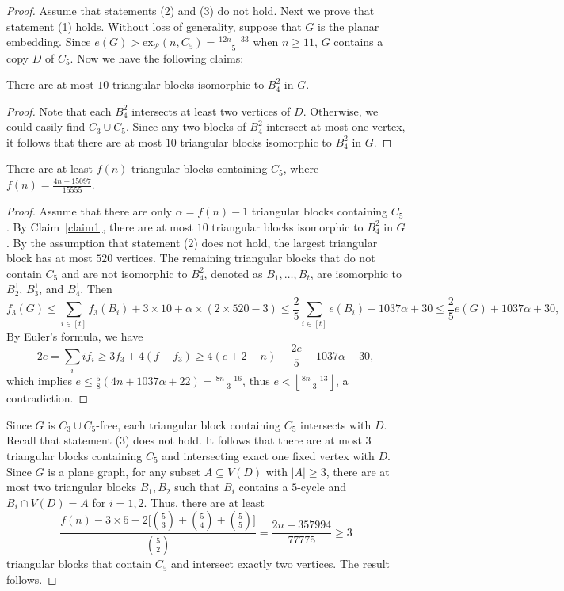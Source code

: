 \documentclass[10pt,a4paper]{amsart}
\newcommand{\ex}{\mathrm{ex}}
\begin{document}
\begin{proof}
    Assume that statements (2) and (3) do not hold. Next we prove that statement (1) holds. Without loss of generality, suppose that $G$ is the planar embedding.
    Since $e(G)>\ex_{\mathcal{P}}(n,C_5)=\frac{12n-33}{5}$ when $n\geq 11$, $G$ contains a copy $D$ of $C_5$. Now we have the following claims:
    
    \begin{claim}\label{claim1}
        There are at most $10$ triangular blocks isomorphic to $B_4^2$ in $G$.
    \end{claim}
    \begin{proof}
        Note that each $B_4^2$ intersects at least two vertices of $D$. Otherwise, we could easily find $C_3\cup C_5$. Since any two blocks of $B_4^2$ intersect at most one vertex, it follows that there are at most $10$ triangular blocks isomorphic to $B_4^2$ in $G$.
    \end{proof}
    
    \begin{claim}\label{claim2}
        There are at least $f(n)$ triangular blocks containing $C_5$, where $f(n)=\frac{4n+15097}{15555}$.
    \end{claim}
    \begin{proof}
        Assume that there are only $\alpha=f(n)-1$ triangular blocks containing $C_5$. By Claim~\ref{claim1}, there are at most $10$ triangular blocks isomorphic to $B_4^2$ in $G$. By the assumption that statement (2) does not hold, the largest triangular block has at most $520$ vertices. The remaining triangular blocks that do not contain $C_5$ and are not isomorphic to $B_4^2$, denoted as $B_1,\ldots,B_t$, are isomorphic to $B_2^1$, $B_3^1$, and $B_4^1$. Then
        $$f_3(G) \leq \sum_{i\in[t]}f_3(B_i)+3\times10+\alpha\times (2\times 520-3) \leq \frac{2}{5}\sum_{i\in [t]}e(B_i)+1037\alpha+30 \leq \frac{2}{5}e(G)+1037\alpha+30,$$
        By Euler's formula, we have
        $$2e = \sum_{i}if_i \geq 3f_3+4(f-f_3) \geq 4(e+2-n)-\frac{2e}{5}-1037\alpha-30,$$
        which implies $e \leq \frac{5}{8}(4n+1037\alpha+22)=\frac{8n-16}{3}$, thus $e<\left\lfloor\frac{8n-13}{3}\right\rfloor$, a contradiction.   
    \end{proof}
    Since $G$ is $C_3\cup C_5$-free, each triangular block containing $C_5$ intersects with $D$.
    Recall that statement (3) does not hold. It follows that there are at most $3$ triangular blocks containing $C_5$ and intersecting exact one fixed vertex with $D$. Since $G$ is a plane graph, for any subset $A\subseteq V(D)$ with $|A|\geq 3$, there are at most two triangular blocks $B_1,B_2$ such that $B_i$ contains a $5$-cycle and $B_i\cap V(D)=A$ for $i=1,2$. Thus, there are at least 
    $$\frac{f(n)-3\times 5-2\big[\binom{5}{3}+\binom{5}{4}+\binom{5}{5}\big]}{\binom{5}{2}}=\frac{2n-357994}{77775}\geq 3$$ 
    triangular blocks that contain $C_5$ and intersect exactly two vertices. The result follows.
\end{proof}
\end{document}
